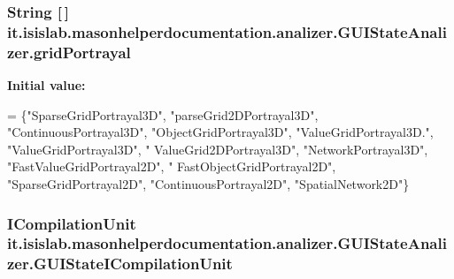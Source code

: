 \hypertarget{classit_1_1isislab_1_1masonhelperdocumentation_1_1analizer_1_1_g_u_i_state_analizer_ae38e62823b53316bca90fde444896897}{
\subsubsection[{grid\-Portrayal}]{\setlength{\rightskip}{0pt plus 5cm}String \mbox{[}$\,$\mbox{]} it.\-isislab.\-masonhelperdocumentation.\-analizer.\-G\-U\-I\-State\-Analizer.\-grid\-Portrayal\hspace{0.3cm}{\ttfamily [static]}}}\label{classit_1_1isislab_1_1masonhelperdocumentation_1_1analizer_1_1_g_u_i_state_analizer_ae38e62823b53316bca90fde444896897}
{\bfseries Initial value\-:}
\begin{DoxyCode}
= \{\textcolor{stringliteral}{"SparseGridPortrayal3D"}, \textcolor{stringliteral}{"parseGrid2DPortrayal3D"}, \textcolor{stringliteral}{"ContinuousPortrayal3D"},
                                \textcolor{stringliteral}{"ObjectGridPortrayal3D"}, \textcolor{stringliteral}{"ValueGridPortrayal3D."}, \textcolor{stringliteral}{"ValueGridPortrayal3D"}, \textcolor{stringliteral}{"
      ValueGrid2DPortrayal3D"},
                                \textcolor{stringliteral}{"NetworkPortrayal3D"}, \textcolor{stringliteral}{"FastValueGridPortrayal2D"}, \textcolor{stringliteral}{"
      FastObjectGridPortrayal2D"}, \textcolor{stringliteral}{"SparseGridPortrayal2D"},
                                \textcolor{stringliteral}{"ContinuousPortrayal2D"}, \textcolor{stringliteral}{"SpatialNetwork2D"}\}
\end{DoxyCode}
\hypertarget{classit_1_1isislab_1_1masonhelperdocumentation_1_1analizer_1_1_g_u_i_state_analizer_a8f27dabd9393f0cfd0e04a7217f63641}{
\subsubsection[{G\-U\-I\-State\-I\-Compilation\-Unit}]{\setlength{\rightskip}{0pt plus 5cm}I\-Compilation\-Unit it.\-isislab.\-masonhelperdocumentation.\-analizer.\-G\-U\-I\-State\-Analizer.\-G\-U\-I\-State\-I\-Compilation\-Unit\hspace{0.3cm}{\ttfamily [private]}}}\label{classit_1_1isislab_1_1masonhelperdocumentation_1_1analizer_1_1_g_u_i_state_analizer_a8f27dabd9393f0cfd0e04a7217f63641}
